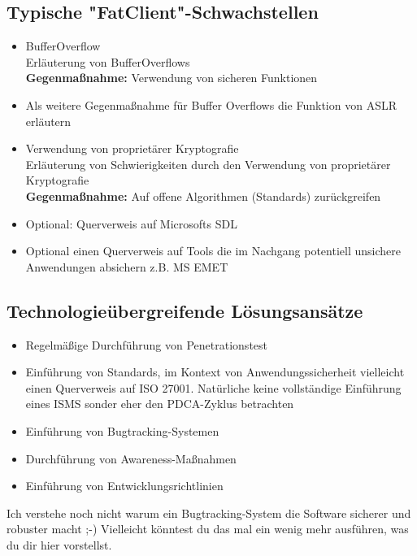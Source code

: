 \subsection{Typische "FatClient"-Schwachstellen}

\begin{itemize}
      \item BufferOverflow\\
        Erläuterung von BufferOverflows\\ 
      	\textbf{Gegenmaßnahme:} Verwendung von sicheren Funktionen
      \item Als weitere Gegenmaßnahme für Buffer Overflows die Funktion von ASLR erläutern
      \item Verwendung von proprietärer Kryptografie\\
        Erläuterung von Schwierigkeiten durch den Verwendung von proprietärer Kryptografie\\ 
      	\textbf{Gegenmaßnahme:}  Auf offene Algorithmen (Standards) zurückgreifen
      \item Optional: Querverweis auf Microsofts SDL
      \item Optional einen Querverweis auf Tools die im Nachgang potentiell unsichere Anwendungen absichern z.B. MS EMET
\end{itemize}


\subsection{Technologieübergreifende Lösungsansätze}

\begin{itemize}
      \item Regelmäßige Durchführung von Penetrationstest
      \item Einführung von Standards, im Kontext von Anwendungssicherheit vielleicht einen Querverweis auf ISO 27001. Natürliche keine vollständige Einführung eines ISMS sonder eher den PDCA-Zyklus betrachten
      \item Einführung von Bugtracking-Systemen
      \item Durchführung von Awareness-Maßnahmen 
      \item Einführung von Entwicklungsrichtlinien 
\end{itemize}

Ich verstehe noch nicht warum ein Bugtracking-System die Software sicherer und robuster macht ;-) Vielleicht könntest du das mal ein wenig mehr ausführen, was du dir hier vorstellst.
